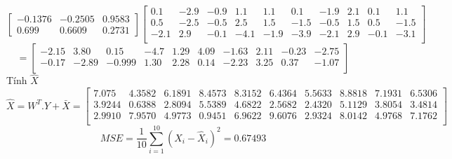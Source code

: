 \documentclass{article}
\begin{document}
	$$
	\begin{bmatrix}
		-0.1376 & -0.2505 & 0.9583\\
		0.699 & 0.6609 & 0.2731
	\end{bmatrix} 
	\begin{bmatrix}
		0.1 & -2.9 & -0.9 & 1.1 & 1.1 & 0.1 & -1.9 & 2.1 & 0.1 & 1.1\\
		0.5 & -2.5 & -0.5 & 2.5 & 1.5 & -1.5 & -0.5 & 1.5 & 0.5 & -1.5\\
		-2.1 & 2.9 & -0.1 & -4.1 & -1.9 & -3.9 & -2.1 & 2.9 & -0.1 & -3.1\\
	\end{bmatrix} 
	$$
	$$
	=
	\begin{bmatrix}
		-2.15 & 3.80 & 0.15 & -4.7 & 1.29 & 4.09 & -1.63 & 2.11 & -0.23 & -2.75\\
		-0.17 & -2.89 & -0.999 & 1.30 & 2.28 & 0.14 & -2.23 & 3.25 & 0.37 & -1.07\\
	\end{bmatrix}
	$$
	Tính $\hat{X}$
	$$\hat{X} = W^T.Y + \bar{X}
	=\begin{bmatrix}
		7.075 & 4.3582 & 6.1891 & 8.4573 & 8.3152 & 6.4364 & 5.5633 & 8.8818 & 7.1931 & 6.5306\\
		3.9244 & 0.6388 & 2.8094 & 5.5389 & 4.6822 & 2.5682 & 2.4320 & 5.1129 & 3.8054 & 3.4814 \\
		2.9910 & 7.9570 & 4.9773& 0.9451& 6.9622& 9.6076& 2.9324& 8.0142 &4.9768 &7.1762\\
	\end{bmatrix}
	$$
	$$MSE = \frac{1}{10}\sum_{i=1}^{10}(X_i - \hat{X}_i)^2 = 0.67493$$
\end{document}
